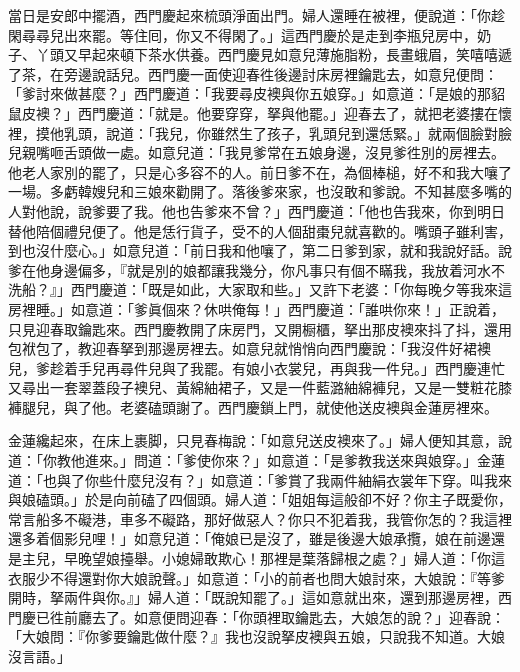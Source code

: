 當日是安郎中擺酒，西門慶起來梳頭淨面出門。婦人還睡在被裡，便說道：「你趁閑尋尋兒出來罷。等住囘，你又不得閑了。」{}這西門慶於是走到李瓶兒房中，奶子、丫頭又早起來頓下茶水供養。西門慶見如意兒薄施脂粉，長畫蛾眉，笑嘻嘻遞了茶，在旁邊說話兒。西門慶一面使迎春徃後邊討床房裡鑰匙去，如意兒便問：「爹討來做甚麼？」西門慶道：「我要尋皮襖與你五娘穿。」如意道：「是娘的那貂鼠皮襖？」西門慶道：「就是。他要穿穿，拏與他罷。」迎春去了，就把老婆摟在懷裡，摸他乳頭，說道：「我兒，你雖然生了孩子，乳頭兒到還恁緊。」就兩個臉對臉兒親嘴咂舌頭做一處。如意兒道：「我見爹常在五娘身邊，沒見爹徃別的房裡去。{}他老人家別的罷了，只是心多容不的人。前日爹不在，為個棒槌，好不和我大嚷了一場。多虧韓嫂兒和三娘來勸開了。落後爹來家，也沒敢和爹說。不知甚麼多嘴的人對他說，說爹要了我。他也告爹來不曾？」西門慶道：「他也告我來，你到明日替他陪個禮兒便了。他是恁行貨子，受不的人個甜棗兒就喜歡的。{}嘴頭子雖利害，到也沒什麼心。」如意兒道：「前日我和他嚷了，第二日爹到家，就和我說好話。說爹在他身邊偏多，『就是別的娘都讓我幾分，你凡事只有個不瞞我，我放着河水不洗船？』」西門慶道：「既是如此，大家取和些。」{}又許下老婆：「你每晚夕等我來這房裡睡。」如意道：「爹眞個來？休哄俺每！」西門慶道：「誰哄你來！」正說着，只見迎春取鑰匙來。西門慶教開了床房門，又開橱櫃，拏出那皮襖來抖了抖，還用包袱包了，教迎春拏到那邊房裡去。如意兒就悄悄向西門慶說：{}「我沒件好裙襖兒，爹趁着手兒再尋件兒與了我罷。有娘小衣裳兒，再與我一件兒。」西門慶連忙又尋出一套翠蓋段子襖兒、黃綿紬裙子，又是一件藍潞紬綿褲兒，又是一雙粧花膝褲腿兒，與了他。老婆磕頭謝了。西門慶鎖上門，就使他送皮襖與金蓮房裡來。

金蓮纔起來，在床上裹脚，只見春梅說：「如意兒送皮襖來了。」婦人便知其意，說道：「你教他進來。」問道：「爹使你來？」如意道：「是爹教我送來與娘穿。」金蓮道：「也與了你些什麼兒沒有？」{}如意道：「爹賞了我兩件紬絹衣裳年下穿。叫我來與娘磕頭。」於是向前磕了四個頭。{}婦人道：「姐姐每這般卻不好？你主子既愛你，常言船多不礙港，車多不礙路，那好做惡人？你只不犯着我，我管你怎的？我這裡還多着個影兒哩！」如意兒道：「俺娘已是沒了，雖是後邊大娘承攬，娘在前邊還是主兒，早晚望娘擡舉。小媳婦敢欺心！那裡是葉落歸根之處？」婦人道：「你這衣服少不得還對你大娘說聲。」如意道：「小的前者也問大娘討來，大娘說：『等爹開時，拏兩件與你。』」婦人道：「既說知罷了。」這如意就出來，還到那邊房裡，西門慶已徃前廳去了。如意便問迎春：「你頭裡取鑰匙去，大娘怎的說？」迎春說：「大娘問：『你爹要鑰匙做什麼？』我也沒說拏皮襖與五娘，只說我不知道。大娘沒言語。」{}

